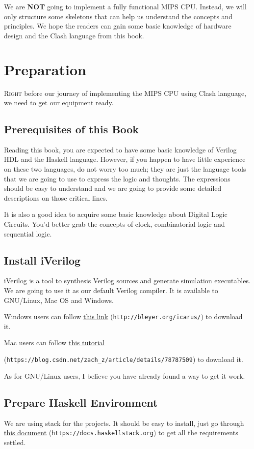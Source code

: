 \documentclass[a4paper,12pt, oneside]{book}
\begin{document}
We are \textbf{NOT} going to implement a fully functional MIPS CPU. Instead, we will only structure some skeletons that can help us understand the concepts and principles. We hope the readers can gain some basic knowledge of hardware design and the Clash language from this book.

\tableofcontents

\mainmatter
\chapter{Preparation}
\lettrine{R}{ight} before our journey of implementing the MIPS CPU using Clash language, we need to get our equipment ready.
\section{Prerequisites of this Book}
Reading this book, you are expected to have some basic knowledge of Verilog HDL and the Haskell language. However, if you happen to have little experience on these two languages, do not worry too much; they are just the language tools that we are going to use to express the logic and thoughts. The expressions should be easy to understand and we are going to provide some detailed descriptions on those critical lines.   

It is also a good idea to acquire some basic knowledge about Digital Logic Circuits. You'd better grab the concepts of clock, combinatorial logic and sequential logic.
\section{Install iVerilog}
iVerilog is a tool to synthesis Verilog sources and generate simulation executables. We are going to use it as our default Verilog compiler. It is available to GNU/Linux, Mac OS and Windows.

Windows users can follow \href{http://bleyer.org/icarus/}{this link} (\texttt{http://bleyer.org/icarus/}) to download it.

Mac users can follow \href{https://blog.csdn.net/zach_z/article/details/78787509}{this tutorial}

(\texttt{https://blog.csdn.net/zach_z/article/details/78787509}) to download it.

As for GNU/Linux users, I believe you have already found a way to get it work.

\section{Prepare Haskell Environment}
We are using stack for the projects. It should be easy to install, just go through \href{https://docs.haskellstack.org}{this document} (\texttt{https://docs.haskellstack.org}) to get all the requirements settled. 
\end{document}

